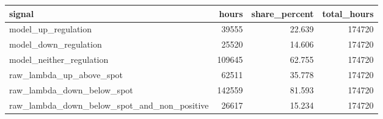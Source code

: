 \begin{tabular}{lrrr}
\toprule
signal & hours & share_percent & total_hours \\
\midrule
model_up_regulation & 39555 & 22.639 & 174720 \\
model_down_regulation & 25520 & 14.606 & 174720 \\
model_neither_regulation & 109645 & 62.755 & 174720 \\
raw_lambda_up_above_spot & 62511 & 35.778 & 174720 \\
raw_lambda_down_below_spot & 142559 & 81.593 & 174720 \\
raw_lambda_down_below_spot_and_non_positive & 26617 & 15.234 & 174720 \\
\bottomrule
\end{tabular}
